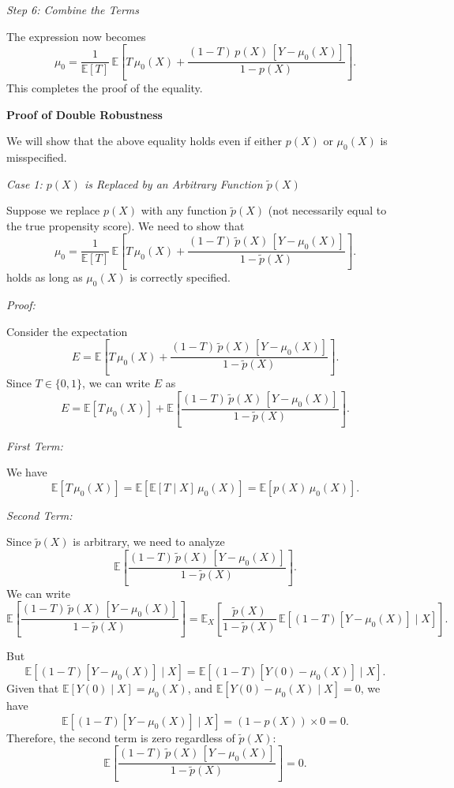 \documentclass{article}
\begin{document}
\textit{Step 6: Combine the Terms}

The expression now becomes
\[
\mu_0 = \frac{1}{\mathbb{E}[T]} \, \mathbb{E} \left[ T \, \mu_0(X) + \frac{(1 - T) \, p(X) \, [Y - \mu_0(X)]}{1 - p(X)} \right].
\]
This completes the proof of the equality.

\textbf{Proof of Double Robustness}

We will show that the above equality holds even if either \( p(X) \) or \( \mu_0(X) \) is misspecified.

\textit{Case 1: \( p(X) \) is Replaced by an Arbitrary Function \( \tilde{p}(X) \)}

Suppose we replace \( p(X) \) with any function \( \tilde{p}(X) \) (not necessarily equal to the true propensity score). We need to show that
\[
\mu_0 = \frac{1}{\mathbb{E}[T]} \, \mathbb{E} \left[ T \, \mu_0(X) + \frac{(1 - T) \, \tilde{p}(X) \, [Y - \mu_0(X)]}{1 - \tilde{p}(X)} \right].
\]
holds as long as \( \mu_0(X) \) is correctly specified.

\textit{Proof:}

Consider the expectation
\[
E = \mathbb{E} \left[ T \, \mu_0(X) + \frac{(1 - T) \, \tilde{p}(X) \, [Y - \mu_0(X)]}{1 - \tilde{p}(X)} \right].
\]
Since \( T \in \{0,1\} \), we can write \( E \) as
\[
E = \mathbb{E} \left[ T \, \mu_0(X) \right] + \mathbb{E} \left[ \frac{(1 - T) \, \tilde{p}(X) \, [Y - \mu_0(X)]}{1 - \tilde{p}(X)} \right].
\]

\textit{First Term:}

We have
\[
\mathbb{E} \left[ T \, \mu_0(X) \right] = \mathbb{E} \left[ \mathbb{E}[ T \mid X ] \, \mu_0(X) \right] = \mathbb{E} \left[ p(X) \, \mu_0(X) \right].
\]

\textit{Second Term:}

Since \( \tilde{p}(X) \) is arbitrary, we need to analyze
\[
\mathbb{E} \left[ \frac{(1 - T) \, \tilde{p}(X) \, [Y - \mu_0(X)]}{1 - \tilde{p}(X)} \right].
\]
We can write
\[
\mathbb{E} \left[ \frac{(1 - T) \, \tilde{p}(X) \, [Y - \mu_0(X)]}{1 - \tilde{p}(X)} \right] = \mathbb{E}_{X} \left[ \frac{ \tilde{p}(X) }{ 1 - \tilde{p}(X) } \, \mathbb{E} \left[ (1 - T) [Y - \mu_0(X)] \mid X \right] \right].
\]

But
\[
\mathbb{E} \left[ (1 - T) [Y - \mu_0(X)] \mid X \right] = \mathbb{E} \left[ (1 - T) [Y(0) - \mu_0(X)] \mid X \right].
\]
Given that \( \mathbb{E}[ Y(0) \mid X ] = \mu_0(X) \), and \( \mathbb{E}[ Y(0) - \mu_0(X) \mid X ] = 0 \), we have
\[
\mathbb{E} \left[ (1 - T) [Y - \mu_0(X)] \mid X \right] = (1 - p(X)) \times 0 = 0.
\]
Therefore, the second term is zero regardless of \( \tilde{p}(X) \):
\[
\mathbb{E} \left[ \frac{(1 - T) \, \tilde{p}(X) \, [Y - \mu_0(X)]}{1 - \tilde{p}(X)} \right] = 0.
\]
\end{document}
